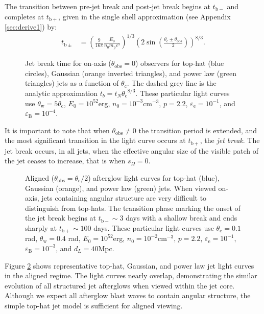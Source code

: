 \documentclass[twocolumn]{aastex62}
\newcommand{\tbm}{\ensuremath{t_{\mathrm{b-}}}}
\newcommand{\tbp}{\ensuremath{t_{\mathrm{b+}}}}
\newcommand{\tbpm}{\ensuremath{t_{\mathrm{b\pm}}}}
\newcommand{\thobs}{\ensuremath{\theta_{\mathrm{obs}}}}
\newcommand{\thW}{\ensuremath{\theta_{\mathrm{w}}}}
\newcommand{\thC}{\ensuremath{\theta_{\mathrm{c}}}}
\newcommand{\epse}{\ensuremath{\varepsilon_{\mathrm{e}}}}
\newcommand{\epsB}{\ensuremath{\varepsilon_{\mathrm{B}}}}
\newcommand{\Mp}{\ensuremath{m_{\mathrm{p}}}}
\newcommand{\som}{\ensuremath{s_{\Omega}}}
\begin{document}
The transition between pre-jet break and post-jet break begins at $\tbm$ and completes at $\tbp$, given in the single shell approximation (see Appendix \ref{sec:derive1}) by:
\begin{align}
	\tbpm &= \left(\frac{9}{16\pi} \frac{E_0}{n_0 \Mp c^5}\right)^{1/3} \left( 2 \sin \left(\frac{\thC\pm\thobs}{2}\right)\right)^{8/3} .\label{eq:tbpm}
\end{align}
\begin{figure}
	\caption{Jet break time for on-axis ($\thobs=0$) observers for top-hat (blue circles), Gaussian (orange inverted triangles), and power law (green triangles) jets as a function of $\thC$. The dashed grey line is the analytic approximation $t_b = t_N \thC^{8/3}$. These particular light curves use $\thW = 5 \thC$, $E_0 = 10^{52}$erg, $n_0=10^{-3}$cm$^{-3}$, $p=2.2$, $\epse = 10^{-1}$, and $\epsB = 10^{-4}$. \label{fig:tbOA}}
\end{figure}



It is important to note that when $\thobs \neq 0$ the transition period is extended, and the most significant transition in the light curve occurs at $\tbp$, the \emph{jet break}.  The jet break occurs, in all jets, when the effective angular size of the visible patch of the jet ceases to increase, that is when $\som = 0$.  

\begin{figure}
	\caption{Aligned ($\thobs = \thC/2$) afterglow light curves for top-hat (blue), Gaussian (orange), and power law (green) jets. When viewed on-axis, jets containing angular structure are very difficult to distinguish from top-hats.  The transition phase marking the onset of the jet break begins at $\tbm\sim3$ days with a shallow break and ends sharply at $\tbp \sim 100$ days.  These particular light curves use $\thC = 0.1$ rad, $\thW = 0.4$ rad, $E_0 = 10^{52}$erg, $n_0=10^{-2}$cm$^{-3}$, $p=2.2$, $\epse = 10^{-1}$, $\epsB = 10^{-3}$, and $d_L=40$Mpc. \label{fig:onaxis}}
\end{figure}

Figure \ref{fig:onaxis} shows representative top-hat, Gaussian, and power law jet light curves in the aligned regime.  The light curves nearly overlap, demonstrating the similar evolution of all structured jet afterglows when viewed within the jet core.  Although we expect all afterglow blast waves to contain angular structure, the simple top-hat jet model is sufficient for aligned viewing.
\end{document}
